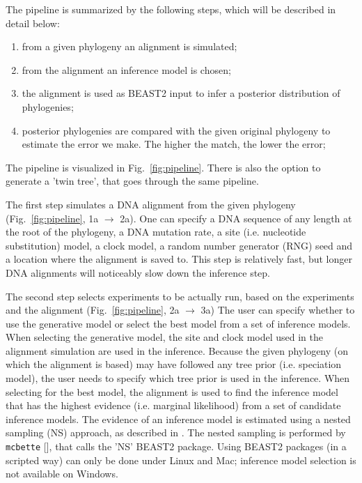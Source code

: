 \documentclass{article}
\begin{document}
The pipeline is summarized by the following steps, which will be described in detail below:
\begin{enumerate}
    \item from a given phylogeny an alignment is simulated;
    \item from the alignment an inference model is chosen;
    \item the alignment is used as BEAST2 input to infer a posterior distribution of phylogenies;
    \item posterior phylogenies are compared with the given original phylogeny to estimate the error we make. The higher the match, the lower the error;
\end{enumerate}
The pipeline is visualized in Fig.~\ref{fig:pipeline}.
There is also the option to generate a 'twin tree',
that goes through the same pipeline.

The first step simulates a DNA alignment from the given 
phylogeny (Fig.~\ref{fig:pipeline}, 1a $\rightarrow$ 2a).
One can specify a DNA sequence
of any length at the root of the phylogeny, a DNA mutation rate, a
site (i.e. nucleotide substitution) model, 
a clock model, a random number generator (RNG) seed and a location
where the alignment is saved to. This step is relatively fast, but longer
DNA alignments will noticeably slow down the inference step.

The second step selects experiments to be actually run, 
based on the experiments and the alignment (Fig.~\ref{fig:pipeline}, 2a $\rightarrow$ 3a) 
The user can specify whether to use the generative model or select the best model from a set of inference models. 
When selecting the generative model, the site and clock model used in the alignment simulation are used in the inference. Because the given phylogeny (on which the alignment is based)
may have followed any tree prior (i.e. speciation model), the user needs
to specify which tree prior is used in the inference. 
When selecting for the best
model, the alignment is used to find the inference model that has the
highest evidence (i.e. marginal likelihood) from a set of candidate inference models.
The evidence of an inference model is estimated using a nested sampling (NS)
approach, as described in \cite{maturana2018model}. The nested sampling is
performed by \verb;mcbette; [\cite{mcbette}], that calls the 'NS' BEAST2 package. 
Using BEAST2 packages (in a scripted way) can only be done under Linux and Mac; 
inference model selection is not available on Windows.
\end{document}
